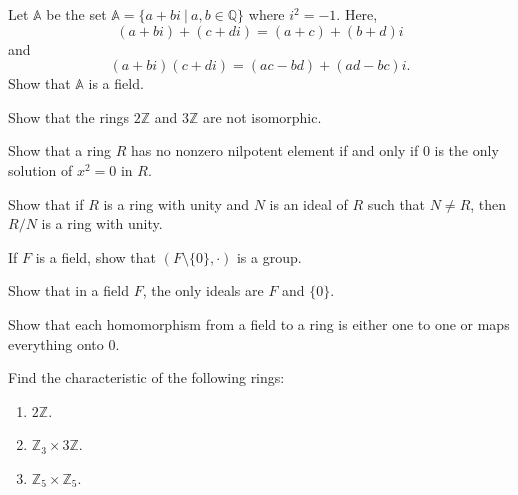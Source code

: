 \begin{mdframed}
    \vspace{0.752cm}
    \begin{Exercise}
        Let $\mathbb{A}$ be the set $\mathbb{A} = \{ a + bi \> | \> a, b \in \mathbb{Q} \}$
        where $i^2 = -1$. Here,
        \[
            (a + bi) + (c + di) = (a + c) + (b+d)i
        \] 
        and 
        \[
            (a+bi)(c+di) = (ac-bd) + (ad - bc)i.
        \]
        Show that $\mathbb{A}$ is a field.
    \end{Exercise}

    \vspace{0.752cm}
    \begin{Exercise}
        Show that the rings $2\mathbb{Z}$ and $3\mathbb{Z}$ are not isomorphic.
    \end{Exercise}

    \vspace{0.752cm}
    \begin{Exercise}
        Show that a ring $R$ has no nonzero nilpotent element if and only if $0$ is the only solution of $x^2 = 0$ in $R$.
    \end{Exercise}

    \vspace{0.752cm}
    \begin{Exercise}
        Show that if $R$ is a ring with unity and $N$ is an ideal of $R$ such that $N \neq R$, then $R/N$ is a ring with unity.
    \end{Exercise}

    \vspace{0.752cm}
    \begin{Exercise}
        If $F$ is a field, show that $(F \setminus \{0\}, \cdot)$ is a group.
    \end{Exercise}

    \vspace{0.752cm}
    \begin{Exercise}
        Show that in a field $F$, the only ideals are $F$ and $\{ 0 \}$.
    \end{Exercise}

    \vspace{0.752cm}
    \begin{Exercise}
        Show that each homomorphism from a field to a ring is either one to one or maps everything onto 0. 
    \end{Exercise}

    \vspace{0.752cm}
    \begin{Exercise}
        Find the characteristic of the following rings:
        \begin{enumerate}
            \item $2 \mathbb{Z}$.
            \item $\mathbb{Z}_3 \times 3 \mathbb{Z}$.
            \item $\mathbb{Z}_5 \times \mathbb{Z}_5$.
        \end{enumerate} 
    \end{Exercise}


\end{mdframed}
